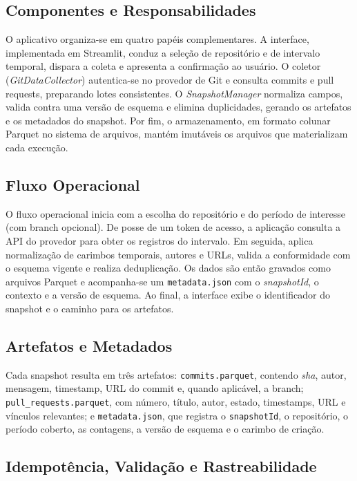 \documentclass[12pt,a4paper]{article}
\begin{document}
\subsection{Componentes e Responsabilidades}

O aplicativo organiza-se em quatro papéis complementares. A interface, implementada em Streamlit, conduz a seleção de repositório e de intervalo temporal, dispara a coleta e apresenta a confirmação ao usuário. O coletor (\textit{GitDataCollector}) autentica-se no provedor de Git e consulta commits e pull requests, preparando lotes consistentes. O \textit{SnapshotManager} normaliza campos, valida contra uma versão de esquema e elimina duplicidades, gerando os artefatos e os metadados do snapshot. Por fim, o armazenamento, em formato colunar Parquet no sistema de arquivos, mantém imutáveis os arquivos que materializam cada execução.

\subsection{Fluxo Operacional}

O fluxo operacional inicia com a escolha do repositório e do período de interesse (com branch opcional). De posse de um token de acesso, a aplicação consulta a API do provedor para obter os registros do intervalo. Em seguida, aplica normalização de carimbos temporais, autores e URLs, valida a conformidade com o esquema vigente e realiza deduplicação. Os dados são então gravados como arquivos Parquet e acompanha-se um \texttt{metadata.json} com o \emph{snapshotId}, o contexto e a versão de esquema. Ao final, a interface exibe o identificador do snapshot e o caminho para os artefatos.

\subsection{Artefatos e Metadados}

Cada snapshot resulta em três artefatos: \texttt{commits.parquet}, contendo \textit{sha}, autor, mensagem, timestamp, URL do commit e, quando aplicável, a branch; \texttt{pull\_requests.parquet}, com número, título, autor, estado, timestamps, URL e vínculos relevantes; e \texttt{metadata.json}, que registra o \texttt{snapshotId}, o repositório, o período coberto, as contagens, a versão de esquema e o carimbo de criação.

\subsection{Idempotência, Validação e Rastreabilidade}
\end{document}

